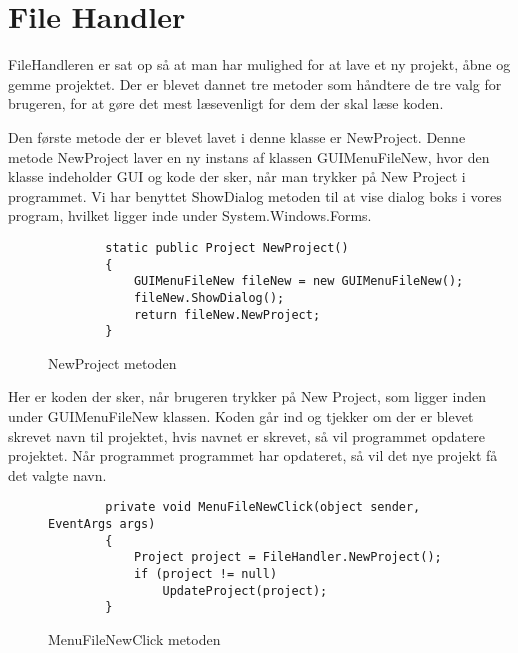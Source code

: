 \section{File Handler}\label{FileHandler}

FileHandleren er sat op så at man har mulighed for at lave et ny projekt, åbne og gemme projektet. Der er blevet dannet tre metoder som håndtere de tre valg for brugeren, for at gøre det mest læsevenligt for dem der skal læse koden.

\vspace{5mm}

Den første metode der er blevet lavet i denne klasse er NewProject. Denne metode NewProject laver en ny instans af klassen GUIMenuFileNew, hvor den klasse indeholder GUI og kode der sker, når man trykker på New Project i programmet. Vi har benyttet ShowDialog metoden til at vise dialog boks i vores program, hvilket ligger inde under System.Windows.Forms.

\begin{figure}[H]
\begin{lstlisting}
 		static public Project NewProject()
        {
            GUIMenuFileNew fileNew = new GUIMenuFileNew();
            fileNew.ShowDialog();
            return fileNew.NewProject;
        }
\end{lstlisting}
\caption{NewProject metoden}\label{NewProjectCode}
\end{figure}

\vspace{5mm}

Her er koden der sker, når brugeren trykker på New Project, som ligger inden under GUIMenuFileNew klassen. Koden går ind og tjekker om der er blevet skrevet navn til projektet, hvis navnet er skrevet, så vil programmet opdatere projektet. Når programmet programmet har opdateret, så vil det nye projekt få det valgte navn.

\begin{figure}[H]
\begin{lstlisting}
        private void MenuFileNewClick(object sender, EventArgs args)
        {
            Project project = FileHandler.NewProject();
            if (project != null)
                UpdateProject(project);
        }
\end{lstlisting}
\caption{MenuFileNewClick metoden}\label{MenuFileNewClickCode}
\end{figure}

\vspace{5mm}

